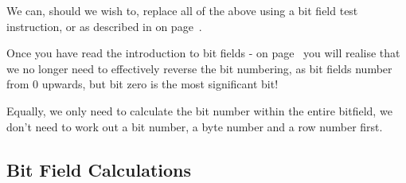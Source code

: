 We can, should we wish to, replace all of the above using a bit field test instruction, or  as described in  on page~\pageref{chp-mc68020-bftst}.

Once you have read the introduction to bit fields -  on page~\pageref{chp-mc68020-bitfields} you will realise that we no longer need to effectively reverse the bit numbering, as bit fields number from 0 upwards, but bit zero is the most significant bit!

Equally, we only need to calculate the bit number within the entire bitfield, we don't need to work out a bit number, a byte number and a row number first.

\subsection{Bit Field Calculations}